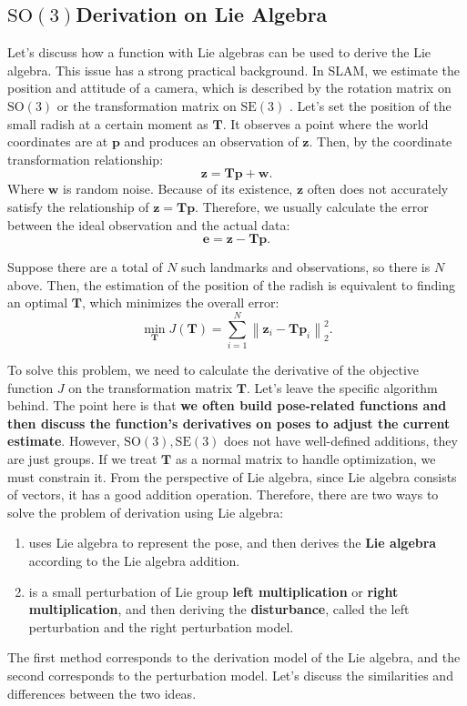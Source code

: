\enlargethispage{9pt}
\subsection{$\mathrm{SO}(3)$Derivation on Lie Algebra}
Let's discuss how a function with Lie algebras can be used to derive the Lie algebra. This issue has a strong practical background. In SLAM, we estimate the position and attitude of a camera, which is described by the rotation matrix on $\mathrm{SO}(3)$ or the transformation matrix on $\mathrm{SE}(3)$ . Let's set the position of the small radish at a certain moment as $\bm{T}$. It observes a point where the world coordinates are at $\bm{p}$ and produces an observation of $\bm{z}$. Then, by the coordinate transformation relationship:
\begin{equation}
\bm{z} = \bm{T} \bm{p} + \bm{w}.
\end{equation}
Where $\bm{w}$ is random noise. Because of its existence, $\bm{z}$ often does not accurately satisfy the relationship of $\bm{z} = \bm{T} \bm{p}$. Therefore, we usually calculate the error between the ideal observation and the actual data:
\begin{equation}
\bm{e} = \bm{z} - \bm{T} \bm{p}.
\end{equation}

Suppose there are a total of $N$ such landmarks and observations, so there is $N$ above. Then, the estimation of the position of the radish is equivalent to finding an optimal $\bm{T}$, which minimizes the overall error:
\begin{equation}
\mathop {\min }\limits_{\bm{T}} J(\bm{T} ) = \sum_{i=1}^{N} \left\| {\bm{z}_i - \bm{ Tp}_i} \right\|^2_2.
\end{equation}

To solve this problem, we need to calculate the derivative of the objective function $J$ on the transformation matrix $\bm{T}$. Let's leave the specific algorithm behind. The point here is that \textbf{we often build pose-related functions and then discuss the function's derivatives on poses to adjust the current estimate}. However, $\mathrm{SO}(3), \mathrm{SE}(3)$ does not have well-defined additions, they are just groups. If we treat $\bm{T}$ as a normal matrix to handle optimization, we must constrain it. From the perspective of Lie algebra, since Lie algebra consists of vectors, it has a good addition operation. Therefore, there are two ways to solve the problem of derivation using Lie algebra:

\begin{enumerate}
	\item uses Lie algebra to represent the pose, and then derives the \textbf{Lie algebra} according to the Lie algebra addition.
	\item is a small perturbation of Lie group \textbf{left multiplication} or \textbf{right multiplication}, and then deriving the \textbf{disturbance}, called the left perturbation and the right perturbation model.
\end{enumerate}

The first method corresponds to the derivation model of the Lie algebra, and the second corresponds to the perturbation model. Let's discuss the similarities and differences between the two ideas.